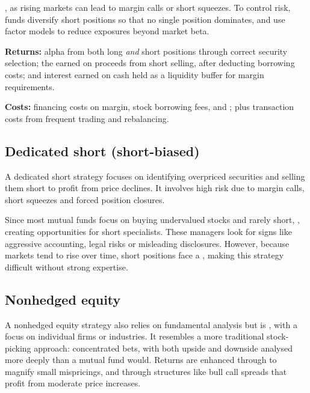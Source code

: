 , as rising markets can
lead to margin calls or short squeezes. To control risk, funds diversify short
positions so that no single position dominates, and use factor models to reduce
exposures beyond market beta.

\begin{imkeybox}[title={Sources of return, and the costs against them}]
\textbf{Returns:} alpha from both long \emph{and} short positions through correct
security selection; the  earned on proceeds from short
selling, after deducting borrowing costs; and interest earned on cash held as a
liquidity buffer for margin requirements.

\smallskip
\textbf{Costs:} financing costs on margin, stock borrowing fees, and
; plus transaction costs from frequent
trading and rebalancing.
\end{imkeybox}

\subsection{Dedicated short (short-biased)}

A dedicated short strategy focuses on identifying overpriced securities and
selling them short to profit from price declines. It involves high risk due to
margin calls, short squeezes and forced position closures.

Since most mutual funds focus on buying undervalued stocks and rarely short,
, creating opportunities for
short specialists. These managers look for signs like aggressive accounting,
legal risks or misleading disclosures. However, because markets tend to rise over
time, short positions face a , making this strategy
difficult without strong expertise.

\subsection{Nonhedged equity}

A nonhedged equity strategy also relies on fundamental analysis but is
, with a focus on individual firms or industries. It resembles a
more traditional stock-picking approach: concentrated bets, with both upside and
downside analysed more deeply than a mutual fund would. Returns are enhanced
through  to magnify small mispricings, and through structures like
bull call spreads that profit from moderate price increases.

